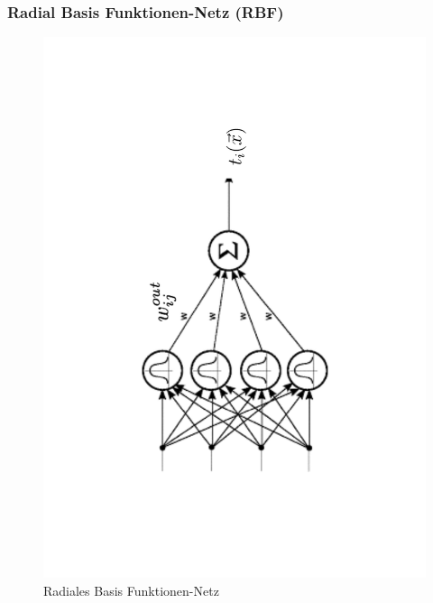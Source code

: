 	\subsubsection{Radial Basis Funktionen-Netz (RBF)}
	\begin{figure}[ht]
		\vspace*{-60pt}
		\centering
		\includegraphics[angle=-90, width=.9\textwidth]{img/rbf}
		\vspace*{-60pt}
		\caption{Radiales Basis Funktionen-Netz}
		\label{deployment}
	\end{figure}
